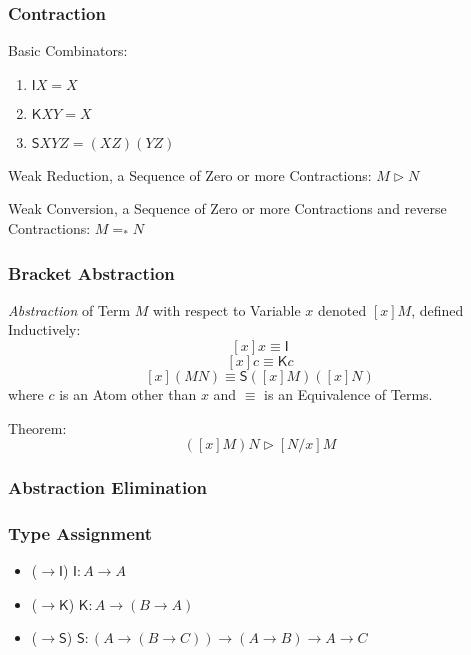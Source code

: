 \subsubsection{Contraction}\label{sec:combinatory_contraction}
\cite{seldin03}

Basic Combinators:
\begin{enumerate}
  \item $\mathsf{I} X = X$
  \item $\mathsf{K} X Y = X$
  \item $\mathsf{S} X Y Z = (X Z) (Y Z)$
\end{enumerate}

Weak Reduction, a Sequence of Zero or more Contractions: $M \rhd N$

Weak Conversion, a Sequence of Zero or more Contractions and reverse
Contractions: $M =_* N$



\subsubsection{Bracket Abstraction}\label{sec:bracket_abstraction}

\emph{Abstraction} of Term $M$ with respect to Variable $x$ denoted
$[x]M$, defined Inductively:\cite{seldin03}
\[
  [x]x \equiv \mathsf{I}
\]\[
  [x]c \equiv \mathsf{K}c
\]\[
  [x](M N) \equiv \mathsf{S}([x]M)([x]N)
\]
where $c$ is an Atom other than $x$ and $\equiv$ is an Equivalence of
Terms.

Theorem:
\[
  ([x]M)N \rhd [N/x]M
\]



\subsubsection{Abstraction Elimination}
\label{sec:abstraction_elimination}



\subsubsection{Type Assignment}\label{sec:combinatory_type}
\cite{seldin03}

\begin{itemize}
  \item ($\rightarrow \mathsf{I}$) $\mathsf{I}: A \rightarrow A$
  \item ($\rightarrow \mathsf{K}$)
    $\mathsf{K}: A \rightarrow (B \rightarrow A)$
  \item ($\rightarrow \mathsf{S}$)
    $\mathsf{S}: (A \rightarrow (B \rightarrow C))
      \rightarrow (A \rightarrow B) \rightarrow A \rightarrow C$
\end{itemize}

